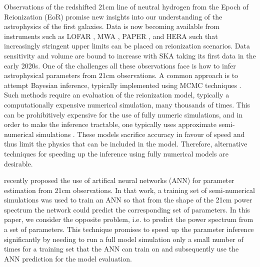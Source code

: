 \documentclass[useAMS,usenatbib]{mnras}
\begin{document}
Observations of the redshifted 21cm line of neutral hydrogen from the Epoch of Reionization (EoR) promise new insights into our understanding of the astrophysics of the first galaxies. 
Data is now becoming available from instruments such as LOFAR \citep{Patil2017}, MWA \citep{Dillon2015}, PAPER \citep{Ali2015}, and HERA \citep{DeBoer2017} such that increasingly stringent upper limits can be placed on reionization scenarios.
Data sensitivity and volume are bound to increase with SKA taking its first data in the early 2020s.
One of the challenges all these observations face is how to infer astrophysical parameters from 21cm observations. 
A common approach is to attempt Bayesian inference, typically implemented using MCMC techniques \citep{greig2015, greig2017, Harker2012, Hassan2017}. 
Such methods require an evaluation of the reionization model, typically a computationally expensive numerical simulation, many thousands of times.
This can be prohibitively expensive for the use of fully numeric simulations, and in order to make the inference tractable, one typically uses approximate semi-numerical simulations \citep{mesinger2007,Santos2010,mesinger2011,Fialkov2012}. 
These models sacrifice accuracy in favour of speed and thus limit the physics that can be included in the model.
Therefore, alternative techniques for speeding up the inference using fully numerical models are desirable. 
 
\citet{shimabukuro2017} recently proposed the use of artifical neural networks (ANN) for parameter estimation from 21cm observations. 
In that work, a training set of semi-numerical simulations was used to train an ANN so that from the shape of the 21cm power spectrum the network could predict the corresponding set of parameters. 
In this paper, we consider the opposite problem, i.e. to predict the power spectrum from a set of parameters. 
This technique promises to speed up the parameter inference significantly by needing to run a full model simulation only a small number of times for a training set that the ANN can train on and subsequently use the ANN prediction for the model evaluation. 


\end{document}
